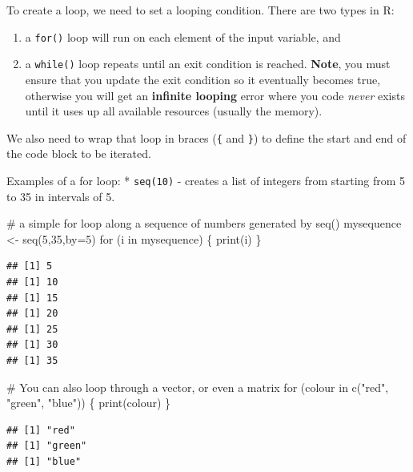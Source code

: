 \documentclass[a4paper]{book}
\newenvironment{Shaded}{}{}
\newcommand{\KeywordTok}[1]{\textcolor[rgb]{0.00,0.00,1.00}{{#1}}}
\newcommand{\DataTypeTok}[1]{{#1}}
\newcommand{\DecValTok}[1]{{#1}}
\newcommand{\StringTok}[1]{\textcolor[rgb]{0.00,0.50,0.50}{{#1}}}
\newcommand{\CommentTok}[1]{\textcolor[rgb]{0.00,0.50,0.00}{{#1}}}
\newcommand{\NormalTok}[1]{{#1}}
\providecommand{\tightlist}{%
  \setlength{\itemsep}{0pt}\setlength{\parskip}{0pt}}
\newlength{\leftbarwidth}
\newlength{\leftbarsep}
\newcommand*{\leftbarcolorcmd}{\color{darkgray}}%
\renewenvironment{leftbar}{%
    \def\FrameCommand{{\leftbarcolorcmd{\vrule width \leftbarwidth\relax\hspace {\leftbarsep}}}}%
    \MakeFramed {\advance \hsize -\width \FrameRestore }%
}{%
    \endMakeFramed
}
\renewenvironment{Shaded}
{\vspace{0em}\begin{leftbar}\begin{snugshade}}
{\end{snugshade}\end{leftbar}\vspace{0pt}}
\begin{document}
To create a loop, we need to set a looping condition. There are two
types in R:

\begin{enumerate}
\def\labelenumi{\arabic{enumi}.}
\tightlist
\item
  a \texttt{for()} loop will run on each element of the input variable,
  and
\item
  a \texttt{while()} loop repeats until an exit condition is reached.
  \textbf{Note}, you must ensure that you update the exit condition so
  it eventually becomes true, otherwise you will get an \textbf{infinite
  looping} error where you code \emph{never} exists until it uses up all
  available resources (usually the memory).
\end{enumerate}

We also need to wrap that loop in braces (\texttt{\{} and \texttt{\}})
to define the start and end of the code block to be iterated.

Examples of a for loop: * \texttt{seq(10)} - creates a list of integers
from starting from 5 to 35 in intervals of 5.

\begin{Shaded}
\begin{Highlighting}[]
\CommentTok{# a simple for loop along a sequence of numbers generated by seq()}
\NormalTok{mysequence <-}\StringTok{ }\KeywordTok{seq}\NormalTok{(}\DecValTok{5}\NormalTok{,}\DecValTok{35}\NormalTok{,}\DataTypeTok{by=}\DecValTok{5}\NormalTok{)}
\NormalTok{for (i in mysequence) \{}
  \KeywordTok{print}\NormalTok{(i)}
\NormalTok{\}}
\end{Highlighting}
\end{Shaded}

\begin{verbatim}
## [1] 5
## [1] 10
## [1] 15
## [1] 20
## [1] 25
## [1] 30
## [1] 35
\end{verbatim}

\begin{Shaded}
\begin{Highlighting}[]
\CommentTok{# You can also loop through a vector, or even a matrix}
\NormalTok{for (colour in }\KeywordTok{c}\NormalTok{(}\StringTok{"red"}\NormalTok{, }\StringTok{"green"}\NormalTok{, }\StringTok{"blue"}\NormalTok{)) \{}
  \KeywordTok{print}\NormalTok{(colour)}
\NormalTok{\}}
\end{Highlighting}
\end{Shaded}

\begin{verbatim}
## [1] "red"
## [1] "green"
## [1] "blue"
\end{verbatim}
\end{document}
